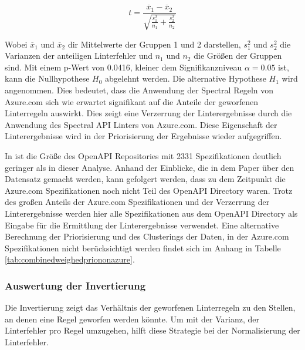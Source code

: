 \[
t=\frac{\overline{x}_1-\overline{x}_2}{\sqrt{\frac{s_1^2}{n_1}+\frac{s_2^2}{n_2}}}
\]

Wobei $\overline{x}_1$ und $\overline{x}_2$ dir Mittelwerte der Gruppen 1 und 2 darstellen, $s_1^2$ und $s_2^2$ die Varianzen der anteiligen Linterfehler und $n_1$ und $n_2$ die Größen der Gruppen sind.
Mit einem p-Wert von 0.0416, kleiner dem Signifikanzniveau $\alpha = 0.05$ ist, kann die Nullhypothese $H_0$ abgelehnt werden. Die alternative Hypothese $H_1$ wird angenommen. Dies bedeutet, dass die Anwendung der Spectral Regeln von Azure.com sich wie erwartet signifikant auf die Anteile der geworfenen Linterregeln auswirkt. Dies zeigt eine Verzerrung der Linterergebnisse durch die Anwendung des Spectral \acs{API} Linters von Azure.com. Diese Eigenschaft der Linterergebnisse wird in der Priorisierung der Ergebnisse wieder aufgegriffen. 

In \parencite{bogner_restruler_2024} ist die Größe des OpenAPI Repositories mit 2331 Spezifikationen deutlich geringer als in dieser Analyse. Anhand der Einblicke, die in dem Paper über den Datensatz gemacht werden, kann gefolgert werden, dass zu dem Zeitpunkt die Azure.com Spezifikationen noch nicht Teil des OpenAPI Directory waren. Trotz des großen Anteils der Azure.com Spezifikationen und der Verzerrung der Linterergebnisse werden hier alle Spezifikationen aus dem OpenAPI Directory als Eingabe für die Ermittlung der Linterergebnisse verwendet. Eine alternative Berechnung der Priorisierung und des Clusterings der Daten, in der Azure.com Spezifikationen nicht berücksichtigt werden findet sich im Anhang in Tabelle \ref{tab:combinedweighedpriononazure}.


\subsubsection{Auswertung der Invertierung} \label{sec:auswertungderinvertierung}
Die Invertierung zeigt das Verhältnis der geworfenen Linterregeln zu den Stellen, an denen eine Regel geworfen werden könnte. Um mit der Varianz, der Linterfehler pro Regel umzugehen, hilft diese Strategie bei der Normalisierung der Linterfehler. 

